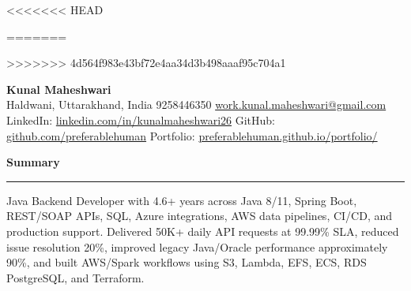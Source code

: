 \documentclass[10pt,letterpaper]{article}
\newcommand{\ressection}[1]{\vspace{3pt}\par\textbf{#1}\par\vspace{0.9pt}\hrule\vspace{1.8pt}}
\begin{document}
<<<<<<< HEAD
\pagestyle{empty}\raggedright\fontsize{12}{10.50}\selectfont
=======
\pagestyle{empty}\raggedright\fontsize{9.98}{10.78}\selectfont
>>>>>>> 4d564f983e43bf72e4aa34d3b498aaaf95c704a1

{\Large \textbf{Kunal Maheshwari}}\\
Haldwani, Uttarakhand, India \textbar{} 9258446350 \textbar{} \href{mailto:work.kunal.maheshwari@gmail.com}{work.kunal.maheshwari@gmail.com}\\
LinkedIn: \href{https://www.linkedin.com/in/kunalmaheshwari26}{linkedin.com/in/kunalmaheshwari26} \textbar{} GitHub: \href{https://github.com/preferablehuman}{github.com/preferablehuman} \textbar{} Portfolio: \href{https://preferablehuman.github.io/portfolio/}{preferablehuman.github.io/portfolio/}

\ressection{Summary}
Java Backend Developer with 4.6+ years across Java 8/11, Spring Boot, REST/SOAP APIs, SQL, Azure integrations, AWS data pipelines, CI/CD, and production support. Delivered 50K+ daily API requests at 99.99\% SLA, reduced issue resolution 20\%, improved legacy Java/Oracle performance approximately 90\%, and built AWS/Spark workflows using S3, Lambda, EFS, ECS, RDS PostgreSQL, and Terraform.
\end{document}

